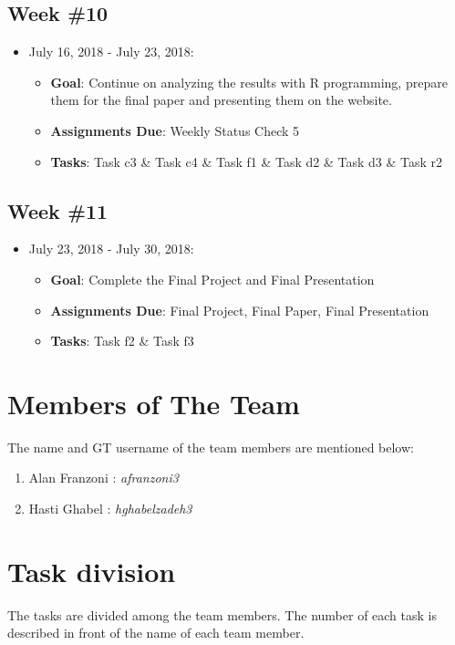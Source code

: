 \documentclass{sigchi}
\begin{document}
 \subsection{Week \#10}
\begin{itemize}
 	\item July 16, 2018 - July 23, 2018:
	\begin{itemize}
 		\item \textbf{Goal}: Continue on analyzing the results with R programming, prepare them for the final paper and presenting them on the website. 
 		\item \textbf{Assignments Due}: Weekly Status Check 5
 		\item \textbf{Tasks}: Task c3 \& Task c4  \& Task f1 \& Task d2 \& Task d3 \& Task r2
	\end{itemize} 
 \end{itemize} 
 
 \subsection{Week \#11}
\begin{itemize}
 	\item July 23, 2018 - July 30, 2018:
	\begin{itemize}
 		\item \textbf{Goal}: Complete the Final Project and Final Presentation
 		\item \textbf{Assignments Due}: Final Project, Final Paper, Final Presentation
 		\item \textbf{Tasks}: Task f2 \& Task f3
	\end{itemize} 
 \end{itemize} 


\section{Members of The Team}
The name and GT username of the team members are mentioned below:
 
\begin{enumerate}
	\item Alan Franzoni : \textit{afranzoni3}
	\item Hasti Ghabel : \textit{hghabelzadeh3}
\end{enumerate}


\section{Task division}
The tasks are divided among the team members. The number of each task is described in front of the name of each team member.
 
\end{document}
